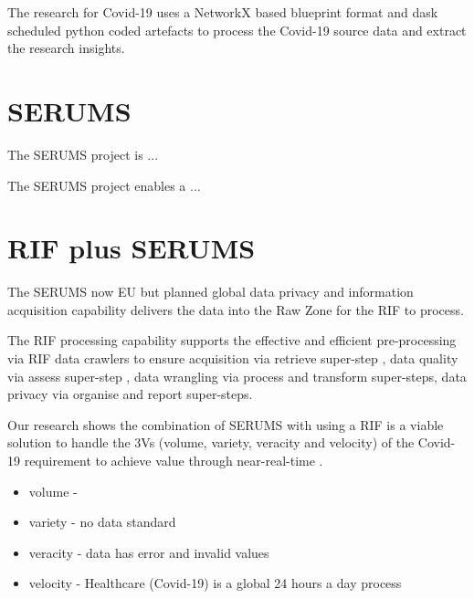 The research for Covid-19 uses a NetworkX based blueprint format and dask scheduled python coded artefacts to process the Covid-19 source data and extract the research insights.

\section{SERUMS}

The SERUMS project is ...

The SERUMS project enables a ...

{\color{red}{AF:
We need a SERUMS summary here!!
}}




\section{RIF plus SERUMS}

The SERUMS now EU but planned global data privacy and information acquisition capability delivers the data into the Raw Zone for the RIF to process.

The RIF processing capability supports the effective and efficient pre-processing via RIF data crawlers to ensure acquisition via retrieve super-step \cite{Vermeulen2018ret} , data quality via assess super-step \cite{Vermeulen2018ass}, data wrangling via process \cite{Vermeulen2018prc} and transform \cite{Vermeulen2018trf} super-steps, data privacy via organise and report super-steps.

Our research shows the combination of SERUMS with using a RIF is a viable solution to handle the 3Vs (volume, variety, veracity and velocity) of the Covid-19 requirement to achieve value through near-real-time .

\begin{itemize}
    \item volume - 
    \item variety - no data standard
    \item veracity - data has error and invalid values
    \item velocity - Healthcare (Covid-19) is a global 24 hours a day process
\end{itemize}
